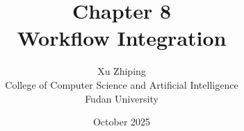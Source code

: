\documentclass[11pt,letterpaper]{book}
\begin{document}
\title{Chapter 8\\
\large Workflow Integration}
\author{Xu Zhiping\\
\small College of Computer Science and Artificial Intelligence\\
\small Fudan University}
\date{October 2025}
\maketitle

\tableofcontents

\setcounter{chapter}{7}




\printindex
\end{document}
